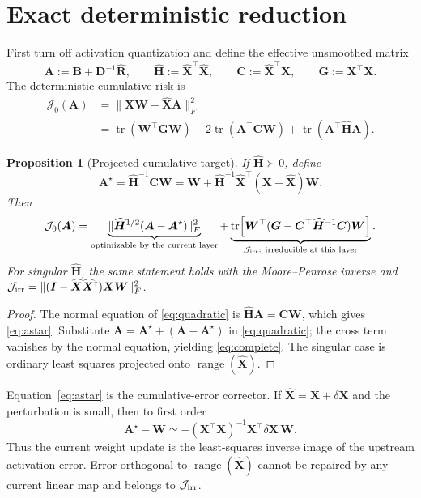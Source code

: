 \documentclass[11pt]{article}
\newtheorem{proposition}{Proposition}
\newcommand{\X}{\bm X}
\newcommand{\Xh}{\widehat{\bm X}}
\newcommand{\W}{\bm W}
\newcommand{\D}{\bm D}
\newcommand{\B}{\bm B}
\newcommand{\Rh}{\widehat{\bm R}}
\newcommand{\Hh}{\widehat{\bm H}}
\newcommand{\C}{\bm C}
\newcommand{\tr}{\operatorname{tr}}
\newcommand{\range}{\operatorname{range}}
\begin{document}
\section{Exact deterministic reduction}

First turn off activation quantization and define the effective unsmoothed
matrix
\[
  \bm A:=\B+\D^{-1}\Rh,
  \qquad \Hh:=\Xh^\top\Xh,
  \qquad \C:=\Xh^\top\X,
  \qquad \bm G:=\X^\top\X.
\]
The deterministic cumulative risk is
\begin{align}
  \mathcal J_0(\bm A)
  &=\|\X\W-\Xh\bm A\|_F^2 \nonumber\\
  &=\tr(\W^\top\bm G\W)-2\tr(\bm A^\top\C\W)
    +\tr(\bm A^\top\Hh\bm A).                         \label{eq:quadratic}
\end{align}

\begin{proposition}[Projected cumulative target]\label{prop:project}
If $\Hh\succ0$, define
\begin{equation}\label{eq:astar}
  \boxed{\quad
  \bm A^\star=\Hh^{-1}\C\W
  =\W+\Hh^{-1}\Xh^\top(\X-\Xh)\W .
  \quad}
\end{equation}
Then
\begin{equation}\label{eq:complete}
  \mathcal J_0(\bm A)
  =\underbrace{\|\Hh^{1/2}(\bm A-\bm A^\star)\|_F^2}_{\text{optimizable by the current layer}}
   +\underbrace{\tr\!\left[\W^\top
     (\bm G-\C^\top\Hh^{-1}\C)\W\right]}_{\mathcal J_{\rm irr}:\ \text{irreducible at this layer}}.
\end{equation}
For singular $\Hh$, the same statement holds with the Moore--Penrose inverse
and $\mathcal J_{\rm irr}=\|(\bm I-\Xh\Xh^\dagger)\X\W\|_F^2$.
\end{proposition}

\begin{proof}
The normal equation of \eqref{eq:quadratic} is
$\Hh\bm A=\C\W$, which gives \eqref{eq:astar}.  Substitute
$\bm A=\bm A^\star+(\bm A-\bm A^\star)$ in \eqref{eq:quadratic}; the cross
term vanishes by the normal equation, yielding \eqref{eq:complete}.  The
singular case is ordinary least squares projected onto $\range(\Xh)$.
\end{proof}

Equation~\eqref{eq:astar} is the cumulative-error corrector.  If
$\Xh=\X+\delta\X$ and the perturbation is small, then to first order
\begin{equation}\label{eq:firstorder}
  \bm A^\star-\W
  \simeq-(\X^\top\X)^{-1}\X^\top\delta\X\,\W.
\end{equation}
Thus the current weight update is the least-squares inverse image of the
upstream activation error.  Error orthogonal to $\range(\Xh)$ cannot be repaired
by any current linear map and belongs to $\mathcal J_{\rm irr}$.
\end{document}
